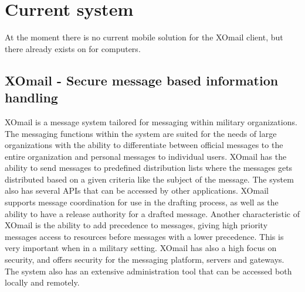 \section{Current system}

At the moment there is no current mobile solution for the XOmail client, but there already exists on for computers.

\subsection{XOmail - Secure message based information handling}

XOmail is a message system tailored for messaging within military organizations. The messaging functions within the system are suited for the needs of large
organizations with the ability to differentiate between official messages to
the entire organization and personal messages to individual users.
\newline
\newline
XOmail has the ability to send messages to predefined distribution lists where the
messages gets distributed based on a given criteria like the subject of the
message. The system also has several APIs that can be accessed by other
applications. XOmail supports message coordination for use in the drafting
process, as well as the ability to have a release authority for a drafted message.
\newline
\newline 
Another characteristic of XOmail is the ability to add precedence to messages, giving high priority messages access to resources before messages with a lower precedence. This is very important when in a military setting.
\newline
\newline
XOmail has also a high focus on security, and offers security for the messaging platform, servers
and gateways.
\newline
\newline
The system also has an extensive administration tool that can be accessed both locally and remotely.